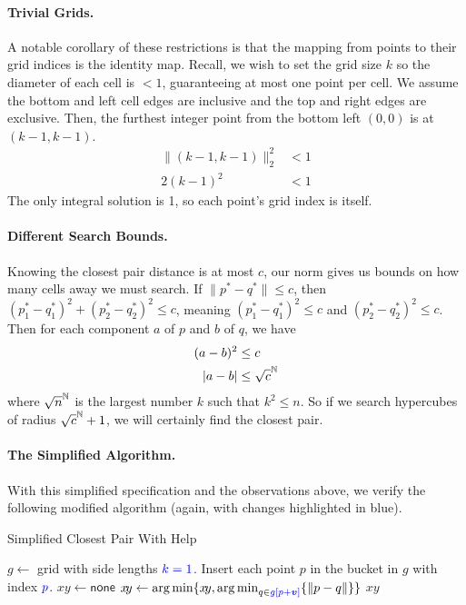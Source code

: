 \documentclass{article}
\begin{document}
\paragraph{Trivial Grids.}
A notable corollary of these restrictions is that the mapping from points to their grid indices is the identity map.
Recall, we wish to set the grid size $k$ so the diameter of each cell is $< 1$, guaranteeing at most one point per cell.
We assume the bottom and left cell edges are inclusive and the top and right edges are exclusive.
Then, the furthest integer point from the bottom left $(0, 0)$ is at $(k - 1, k - 1)$.
\begin{align*}
  \| (k - 1, k-1) \|_2^2 & < 1 \\
  2(k-1)^2 & < 1
\end{align*}
The only integral solution is 1, so each point's grid index is itself.

\paragraph{Different Search Bounds.}
Knowing the closest pair distance is at most $c$, our norm gives us bounds on how many cells away we must search.
If $\| p^* - q^* \| \leq c$, then $(p_1^* - q_1^*)^2 + (p_2^* - q_2^*)^2 \leq c$, meaning $(p_1^* - q_1^*)^2\leq c$ and $(p_2^* - q_2^*)^2 \leq c$.
Then for each component $a$ of $p$ and $b$ of $q$, we have
\begin{align*}
  (a - b)^2 & \leq c \\
  |a - b| & \leq \sqrt{c}^{\mathbb{N}}
\end{align*}
where $\sqrt{n}^{\mathbb{N}}$ is the largest number $k$ such that $k^2 \leq n$.
So if we search hypercubes of radius $\sqrt{c}^{\mathbb{N}} + 1$, we will certainly find the closest pair.

\paragraph{The Simplified Algorithm.}
With this simplified specification and the observations above, we verify the following modified algorithm (again, with changes highlighted in blue).

\begin{algorithm}
  \caption{Simplified Closest Pair With Help}\label{alg:cp_with_help_simple}
  \begin{algorithmic}
  \State $g \gets $ grid with side lengths ${\color{blue}k = 1}$.
  \State Insert each point $p$ in the bucket in $g$ with index $\color{blue}p$.
  \State $x\!y \gets \mathsf{none}$
      \State $x\!y \gets \operatorname*{arg\,min} \{ x\!y, \operatorname*{arg\,min}_{q \in {\color{blue}g[p+\bm{v}]}}\{\| p - q \|\}\}$
    \EndFor
  \EndFor
  \State \Return $x\!y$
  \end{algorithmic}
\end{algorithm}
\end{document}
